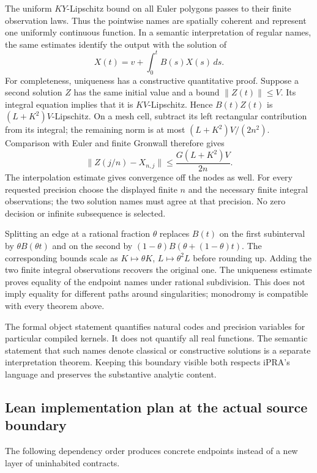 The uniform $KY$-Lipschitz bound on all Euler polygons passes to their finite observation laws. Thus the pointwise names are spatially coherent and represent one uniformly continuous function. In a semantic interpretation of regular names, the same estimates identify
the output with the solution of
\[
 X(t)=v+\int_0^tB(s)X(s)\,ds.
\]
For completeness, uniqueness has a constructive quantitative proof. Suppose
a second solution $Z$ has the same initial value and a bound
$\lVert Z(t)\rVert\le V$. Its integral equation implies that it is
$KV$-Lipschitz. Hence $B(t)Z(t)$ is $(L+K^2)V$-Lipschitz. On a mesh cell,
subtract its left rectangular contribution from its integral; the remaining
norm is at most $(L+K^2)V/(2n^2)$. Comparison with Euler and finite Gronwall
therefore gives
\[
 \lVert Z(j/n)-X_{n,j}\rVert
 \le\frac{G(L+K^2)V}{2n}.
\]
The interpolation estimate gives convergence off the nodes as well. For
every requested precision choose the displayed finite $n$ and the necessary
finite integral observations; the two solution names must agree at that
precision. No zero decision or infinite subsequence is selected.

Splitting an edge at a rational fraction $\theta$ replaces $B(t)$ on the
first subinterval by $\theta B(\theta t)$ and on the second by
$(1-\theta)B(\theta+(1-\theta)t)$. The corresponding bounds scale as
$K\mapsto\theta K$, $L\mapsto\theta^2L$ before rounding up. Adding the two
finite integral observations recovers the original one. The uniqueness
estimate proves equality of the endpoint names under rational subdivision.
This does not imply equality for different paths around singularities;
monodromy is compatible with every theorem above.

The formal object statement quantifies natural codes and precision variables
for particular compiled kernels. It does not quantify all real functions.
The semantic statement that such names denote classical or constructive
solutions is a separate interpretation theorem. Keeping this boundary visible
both respects iPRA's language and preserves the substantive analytic content.

\subsection{Lean implementation plan at the actual source boundary}

The following dependency order produces concrete endpoints instead of a
new layer of uninhabited contracts.

